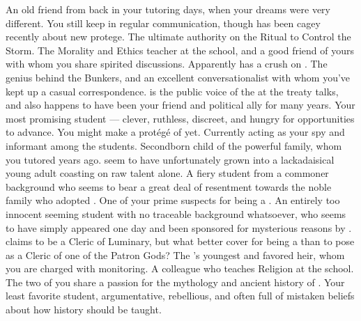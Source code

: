\documentclass[char]{GL2020}
\begin{document}
\begin{contacts}
    \contact{\cWildCard{}} An old friend from back in your tutoring days, when your dreams were very different. You still keep in regular communication, though \cWildCard{} has been cagey recently about \cWildCard{\their} new protege.  
    \contact{\cLibrarian{}} The ultimate authority on the Ritual to Control the Storm.
    \contact{\cEthics{}} The Morality and Ethics teacher at the school, and a good friend of yours with whom you share spirited discussions. Apparently has a crush on \cBeetle{}.
    \contact{\cBunker{}} The genius behind the Bunkers, and an excellent conversationalist with whom you've kept up a casual correspondence.
    \contact{\cEvil{}} \cEvil{} is the public voice of the \cQueen{\Monarch} at the treaty talks, and also happens to have been your friend and political ally for many years.
    \contact{\cLibAssist{}} Your most promising student — clever, ruthless, discreet, and hungry for opportunities to advance. You might make a protégé of \cLibAssist{\them} yet. Currently acting as your spy and informant among the students.
    \contact{\cChupStudent{}} Secondborn child of the powerful \cChupStudent{\formal} family, whom you tutored years ago. \cChupStudent{\They} seem\cChupStudent{\verbs} to have unfortunately grown into a lackadaisical young adult coasting on raw talent alone.
    \contact{\cAdopted{}} A fiery student from a commoner background who seems to bear a great deal of resentment towards the noble \cAdopted{\formal} family who adopted \cAdopted{\them}. One of your prime suspects for being a \pGoatie{}.
    \contact{\cDisney{}} An entirely too innocent seeming student with no traceable background whatsoever, who seems to have simply appeared one day and been sponsored for mysterious reasons by \cWildCard{}. \cDisney{} claims to be a Cleric of Luminary, but what better cover for being a \pGoatie{} than to pose as a Cleric of one of the Patron Gods?
    \contact{\cPrince{}} The \cQueen{\Monarch}'s youngest \cPrince{\offspring} and favored heir, whom you are charged with monitoring.
    \contact{\cBeetle{}} A colleague who teaches Religion at the school. The two of you share a passion for the mythology and ancient history of \pEarth{}.
    \contact{\cTechStar{}} Your least favorite student, argumentative, rebellious, and often full of mistaken beliefs about how history should be taught.  
\end{contacts}
\end{document}
